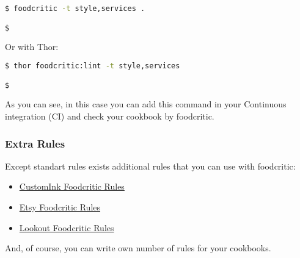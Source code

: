 \begin{lstlisting}[language=Bash,label=lst:testing-thor8]
$ foodcritic -t style,services .

$
\end{lstlisting}

Or with Thor:

\begin{lstlisting}[language=Bash,label=lst:testing-thor9]
$ thor foodcritic:lint -t style,services

$
\end{lstlisting}

As you can see, in this case you can add this command in your Continuous integration (CI) and check your cookbook by foodcritic.

\subsubsection{Extra Rules}

Except standart rules exists additional rules that you can use with foodcritic:

\begin{itemize}
  \item \href{https://github.com/customink-webops/foodcritic-rules}{CustomInk Foodcritic Rules}
  \item \href{https://github.com/etsy/foodcritic-rules}{Etsy Foodcritic Rules}
  \item \href{https://github.com/lookout/lookout-foodcritic-rules}{Lookout Foodcritic Rules}
\end{itemize}

And, of course, you can write own number of rules for your cookbooks.